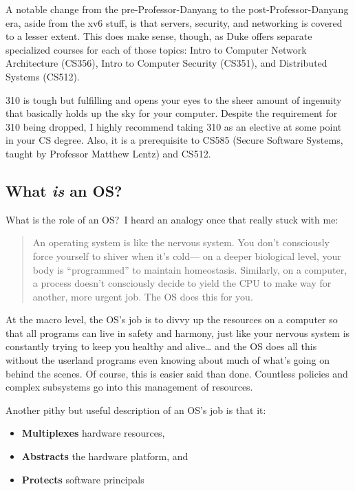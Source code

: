 \documentclass[fontsize=12pt,twoside=on,openright,parskip=half]{scrbook}
\begin{document}
A notable change from the pre-Professor-Danyang to the post-Professor-Danyang
era, aside from the xv6 stuff, is that servers, security, and networking is
covered to a lesser extent. This does make sense, though, as Duke offers
separate specialized courses for each of those topics: Intro to Computer
Network Architecture (CS356), Intro to Computer Security (CS351), and
Distributed Systems (CS512).

310 is tough but fulfilling and opens your eyes to the sheer amount of
ingenuity that basically holds up the sky for your computer. Despite the
requirement for 310 being dropped, I highly recommend taking 310 as an elective
at some point in your CS degree. Also, it is a prerequisite to CS585 (Secure
Software Systems, taught by Professor Matthew Lentz) and CS512.

\subsection*{What \emph{is} an OS?}
What is the role of an OS?\ I heard an analogy once that really stuck with me:

\begin{quote}
An operating system is like the nervous system. You don’t consciously force
yourself to shiver when it’s cold— on a deeper biological level, your body is
“programmed” to maintain homeostasis. Similarly, on a computer, a process
doesn’t consciously decide to yield the CPU to make way for another, more
urgent job. The OS does this for you.
\end{quote}

At the macro level, the OS’s job is to divvy up the resources on a computer so
that all programs can live in safety and harmony, just like your nervous system
is constantly trying to keep you healthy and alive… and the OS does all this
without the userland programs even knowing about much of what’s going on behind
the scenes. Of course, this is easier said than done. Countless policies and
complex subsystems go into this management of resources.

Another pithy but useful description of an OS’s job is that it:
\begin{itemize}
    \item \textbf{Multiplexes} hardware resources,
    \item \textbf{Abstracts} the hardware platform, and
    \item \textbf{Protects} software principals
\end{itemize}
\end{document}
